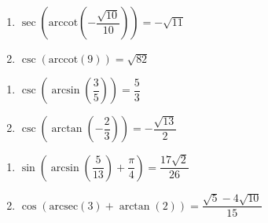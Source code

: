 \documentclass{ximera}
\begin{document}
\begin{multicols}{2}

\begin{enumerate}

\setcounter{enumi}{\value{HW}}

\item  $\sec\left(\text{arccot}\left(-\dfrac{\sqrt{10}}{10}\right)\right) = -\sqrt{11}$
\item  $\csc\left(\text{arccot}\left(9 \right)\right) = \sqrt{82}$ 

\setcounter{HW}{\value{enumi}}

\end{enumerate}

\end{multicols}

\begin{multicols}{2}

\begin{enumerate}

\setcounter{enumi}{\value{HW}}

\item  $\csc\left(\arcsin\left(\dfrac{3}{5}\right)\right) = \dfrac{5}{3}$
\item  $\csc\left(\arctan\left(-\dfrac{2}{3}\right)\right) = -\dfrac{\sqrt{13}}{2}$

\setcounter{HW}{\value{enumi}}

\end{enumerate}

\end{multicols}

\begin{multicols}{2}

\begin{enumerate}

\setcounter{enumi}{\value{HW}}

\item  $\sin\left(\arcsin\left( \dfrac{5}{13} \right) + \dfrac{\pi}{4}\right) = \dfrac{17\sqrt{2}}{26}$
\item  $\cos\left( \text{arcsec}(3) + \arctan(2) \right) = \dfrac{\sqrt{5} - 4\sqrt{10}}{15}$ %

\setcounter{HW}{\value{enumi}}

\end{enumerate}

\end{multicols}
\end{document}
